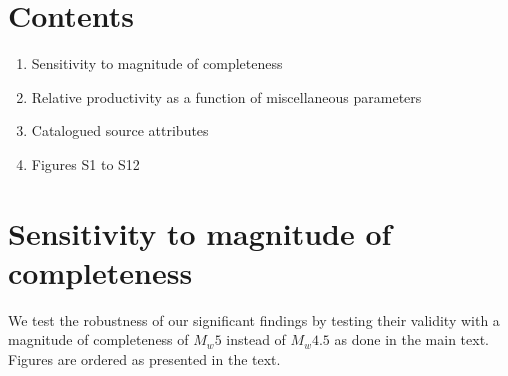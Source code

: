\documentclass[draft]{agujournal}
\begin{document}

 



%
%

\section*{Contents}
\begin{enumerate}
\item Sensitivity to magnitude of completeness
\item Relative productivity as a function of miscellaneous parameters
\item Catalogued source attributes
\item Figures S1 to S12
\end{enumerate}

\section*{Sensitivity to magnitude of completeness}
We test the robustness of our significant findings by testing their validity with a magnitude of completeness of $M_w5$ instead of $M_w4.5$ as done in the main text. Figures are ordered as presented in the text.
\end{document}
